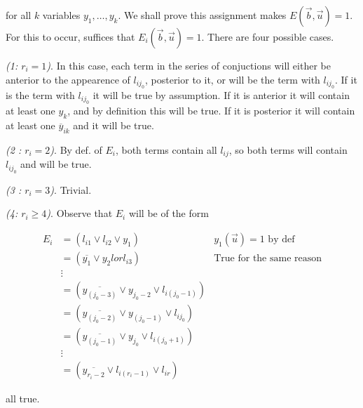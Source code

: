\documentclass[a4paper, 12pt]{article}
\begin{document}
for all $k$ variables $y_1, \ldots, y_k$. We shall prove this assignment makes 
$E(\overrightarrow{b}, \overrightarrow{u}) = 1$. For this to occur, suffices 
that $E_i(\overrightarrow{b}, \overrightarrow{u}) = 1$. There are 
four possible cases.

\textit{(1: $r_i = 1$)}. In this case, each term in the series of conjuctions 
will either be anterior to the appearence of $l_{i j_0}$, posterior to it,
or will be the term with $l_{i j_0}$. If it is the term with $l_{ij_0}$ it 
will be true by assumption. If it is anterior it will contain at least 
one $y_{k}$, and by definition this will be true. If it is posterior 
it will contain at least one $\overline{y}_{i k}$ and it will be true.


\textit{(2 : $r_i = 2$)}. By def. of $E_i$, both terms contain all 
$l_{i j}$, so both terms will contain $l_{i j_0}$ and will 
be true.

\textit{(3 : $r_i = 3$)}. Trivial.

\textit{(4: $r_i \geq 4$)}. Observe that $E_i$ will be of the form 

\begin{align*}
    E_i &= (l_{i 1} \lor  l_{i 2} \lor  y_{ 1}) &\text{$y_{ 1}(\overrightarrow{u}) = 1$ by def} \\ 
        &=(\overline{y_{ 1}} \lor  y_{ 2} lor l_{i 3}) &\text{True for the same reason} \\ 
        &\vdots \\ 
        &=(\overline{y_{ (j_0 - 3)}} \lor y_{ j_0 - 2} \lor  l_{i (j_0 -1)})\\
        &=(\overline{y_{ (j_0 - 2)}} \lor y_{ ( j_0 - 1 )} \lor  l_{i j_0})\\
        &=(\overline{y_{ (j_0 - 1)}} \lor y_{ j_0} \lor  l_{i ( j_0 + 1)})\\
        &\vdots \\ 
        &=(\overline{y_{r_i - 2}} \lor  l_{i( r_i - 1 )} \lor  l_{ir})
\end{align*}

all true.
\end{document}
